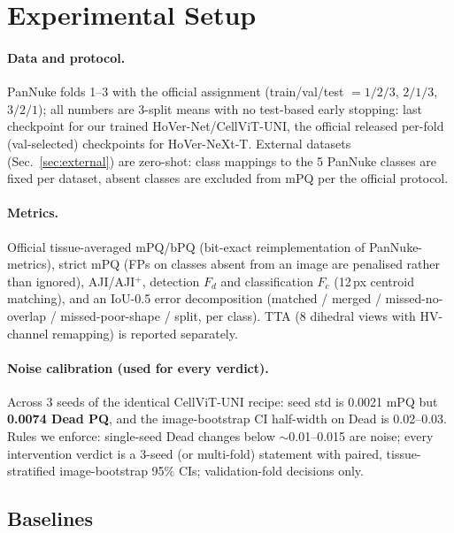 \documentclass[11pt]{article}
\begin{document}
\section{Experimental Setup}
\label{sec:setup}

\paragraph{Data and protocol.} PanNuke folds 1--3 with the official assignment (train/val/test
$=1/2/3$, $2/1/3$, $3/2/1$); all numbers are 3-split means with no test-based early stopping:
last checkpoint for our trained HoVer-Net/CellViT-UNI, the official released per-fold
(val-selected) checkpoints for HoVer-NeXt-T. External datasets (Sec.~\ref{sec:external}) are zero-shot: class
mappings to the 5 PanNuke classes are fixed per dataset, absent classes are excluded from mPQ
per the official protocol.

\paragraph{Metrics.} Official tissue-averaged mPQ/bPQ (bit-exact reimplementation of
PanNuke-metrics), strict mPQ (FPs on classes absent from an image are penalised rather than
ignored), AJI/AJI$^+$, detection $F_d$ and classification $F_c$ (12\,px centroid matching), and
an IoU-0.5 error decomposition (matched / merged / missed-no-overlap / missed-poor-shape /
split, per class). TTA (8 dihedral views with HV-channel remapping) is reported separately.

\paragraph{Noise calibration (used for every verdict).} Across 3 seeds of the identical
CellViT-UNI recipe: seed std is 0.0021 mPQ but \textbf{0.0074 Dead PQ}, and the image-bootstrap
CI half-width on Dead is 0.02--0.03. Rules we enforce: single-seed Dead changes below
$\sim$0.01--0.015 are noise; every intervention verdict is a 3-seed (or multi-fold) statement
with paired, tissue-stratified image-bootstrap 95\% CIs; validation-fold decisions only.

\subsection{Baselines}
\label{sec:baselines}
\end{document}
